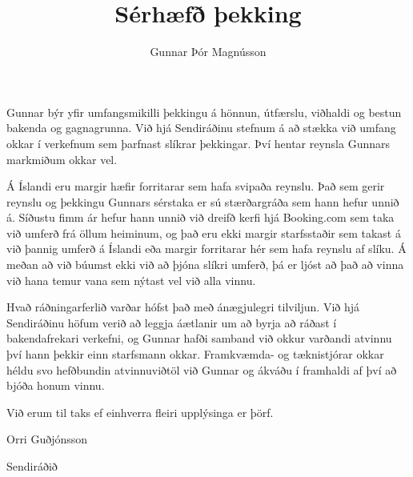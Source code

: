 \documentclass[11pt]{article}
\author{Gunnar Þór Magnússon}
\title{Sérhæfð þekking}
\date{}
\begin{document}
\maketitle
Gunnar býr yfir umfangsmikilli þekkingu á hönnun, útfærslu, viðhaldi og bestun bakenda og gagnagrunna. Við hjá Sendiráðinu stefnum á að stækka við umfang okkar í verkefnum sem þarfnast slíkrar þekkingar. Því hentar reynsla Gunnars markmiðum okkar vel.

Á Íslandi eru margir hæfir forritarar sem hafa svipaða reynslu. Það sem gerir reynslu og þekkingu Gunnars sérstaka er sú stærðargráða sem hann hefur unnið á. Síðustu fimm ár hefur hann unnið við dreifð kerfi hjá Booking.com sem taka við umferð frá öllum heiminum, og það eru ekki margir starfsstaðir sem takast á við þannig umferð á Íslandi eða margir forritarar hér sem hafa reynslu af slíku. Á meðan að við búumst ekki við að þjóna slíkri umferð, þá er ljóst að það að vinna við hana temur vana sem nýtast vel við alla vinnu.

Hvað ráðningarferlið varðar hófst það með ánægjulegri tilviljun. Við hjá Sendiráðinu höfum verið að leggja áætlanir um að byrja að ráðast í bakendafrekari verkefni, og Gunnar hafði samband við okkur varðandi atvinnu því hann þekkir einn starfsmann okkar. Framkvæmda- og tæknistjórar okkar héldu svo hefðbundin atvinnuviðtöl við Gunnar og ákváðu í framhaldi af því að bjóða honum vinnu.

Við erum til taks ef einhverra fleiri upplýsinga er þörf.


\bigskip
Orri Guðjónsson

Sendiráðið
\end{document}
